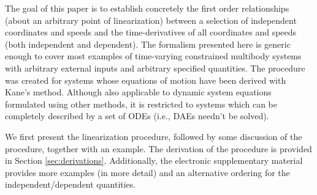 \documentclass[smallcondensed]{svjour3}                     %
\begin{document}
The goal of this paper is to establish concretely the first order relationships
(about an arbitrary point of linearization) between a selection of independent
coordinates and speeds and the time-derivatives of all coordinates and speeds
(both independent and dependent). The formalism presented here is generic
enough to cover most examples of time-varying constrained multibody systems
with arbitrary external inputs and arbitrary specified quantities.  The
procedure was created for systems whose equations of motion have been derived
with Kane's method. Although also applicable to dynamic system equations
formulated using other methods, it is restricted to systems which can be
completely described by a set of ODEs (i.e., DAEs needn't be solved).

We first present the linearization procedure, followed by some discussion of
the procedure, together with an example. The derivation of the procedure is
provided in Section \ref{sec:derivations}. Additionally, the electronic
supplementary material provides more examples (in more detail) and an
alternative ordering for the independent/dependent quantities.
\end{document}
